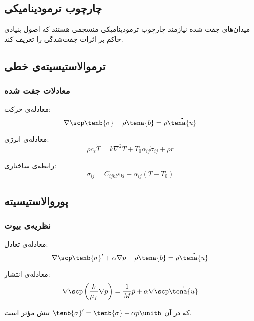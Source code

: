 \subsection{چارچوب ترمودینامیکی}

میدان‌های جفت شده نیازمند چارچوب ترمودینامیکی منسجمی هستند که اصول بنیادی حاکم بر اثرات جفت‌شدگی را تعریف کند.

\subsection{ترموالاستیسیته‌ی خطی}

\subsubsection{معادلات جفت شده}
معادله‌ی حرکت:
\begin{equation}
	\nabla \scp \tenb{\sigma} + \rho \tena{b} = \rho \ddot{\tena{u}}
\end{equation}

معادله‌ی انرژی:
\begin{equation}
	\rho c_\varepsilon \dot{T} = k \nabla^2 T + T_0 \alpha_{ij} \dot{\sigma}_{ij} + \rho r
\end{equation}

رابطه‌ی ساختاری:
\begin{equation}
	\sigma_{ij} = C_{ijkl} \varepsilon_{kl} - \alpha_{ij} (T - T_0)
\end{equation}

\subsection{پوروالاستیسیته}

\subsubsection{نظریه‌ی بیوت}
معادله‌ی تعادل:
\begin{equation}
	\nabla \scp \tenb{\sigma}' + \alpha \nabla p + \rho \tena{b} = \rho \ddot{\tena{u}}
\end{equation}

معادله‌ی انتشار:
\begin{equation}
	\nabla \scp \left( \frac{k}{\mu_f} \nabla p \right) = \frac{1}{M} \dot{p} + \alpha \nabla \scp \dot{\tena{u}}
\end{equation}

که در آن $\tenb{\sigma}' = \tenb{\sigma} + \alpha p \unitb$ تنش مؤثر است.

